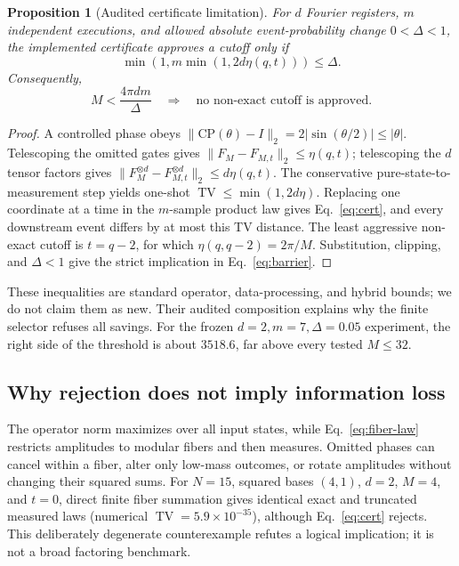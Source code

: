 \documentclass[10pt,twocolumn]{article}
\newtheorem{proposition}{Proposition}
\newcommand{\TV}{\operatorname{TV}}
\begin{document}
\begin{proposition}[Audited certificate limitation]
For $d$ Fourier registers, $m$ independent executions, and allowed absolute
event-probability change $0<\Delta<1$, the implemented certificate approves a
cutoff only if
\begin{equation}
 \min\!\left(1,m\min(1,2d\eta(q,t))\right)\leq\Delta.
 \label{eq:cert}
\end{equation}
Consequently,
\begin{equation}
 M<\frac{4\pi dm}{\Delta}
 \quad\Longrightarrow\quad
 \text{no non-exact cutoff is approved.} \label{eq:barrier}
\end{equation}
\end{proposition}

\begin{proof}
A controlled phase obeys
$\|\mathrm{CP}(\theta)-I\|_2=2|\sin(\theta/2)|\leq|\theta|$.
Telescoping the omitted gates gives
$\|F_M-F_{M,t}\|_2\leq\eta(q,t)$; telescoping the $d$ tensor factors gives
$\|F_M^{\otimes d}-F_{M,t}^{\otimes d}\|_2\leq d\eta(q,t)$.
The conservative pure-state-to-measurement step yields one-shot
$\TV\leq\min(1,2d\eta)$.  Replacing one coordinate at a time in the
$m$-sample product law gives Eq.~\eqref{eq:cert}, and every downstream event
differs by at most this TV distance.  The least aggressive non-exact cutoff is
$t=q-2$, for which $\eta(q,q-2)=2\pi/M$.  Substitution, clipping, and
$\Delta<1$ give the strict implication in Eq.~\eqref{eq:barrier}.
\end{proof}

These inequalities are standard operator, data-processing, and hybrid
bounds; we do not claim them as new.  Their audited composition explains why
the finite selector refuses all savings.  For the frozen
$d=2,m=7,\Delta=0.05$ experiment, the right side of the threshold is about
$3518.6$, far above every tested $M\leq32$.

\subsection{Why rejection does not imply information loss}

The operator norm maximizes over all input states, while
Eq.~\eqref{eq:fiber-law} restricts amplitudes to modular fibers and then
measures.  Omitted phases can cancel within a fiber, alter only low-mass
outcomes, or rotate amplitudes without changing their squared sums.  For
$N=15$, squared bases $(4,1)$, $d=2$, $M=4$, and $t=0$, direct finite fiber
summation gives identical exact and truncated measured laws (numerical
$\TV=5.9\times10^{-35}$), although Eq.~\eqref{eq:cert} rejects.  This
deliberately degenerate counterexample refutes a logical implication; it is
not a broad factoring benchmark.
\end{document}

